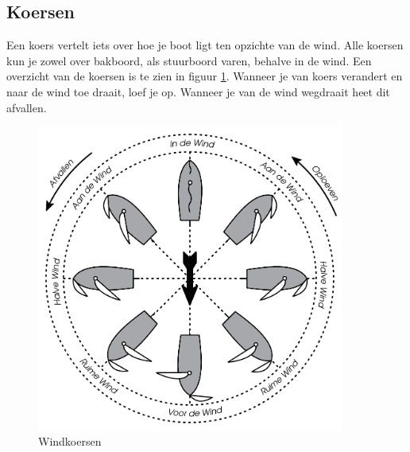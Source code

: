 \subsection{Koersen}
Een koers vertelt iets over hoe je boot ligt ten opzichte van de wind. Alle koersen kun je zowel over bakboord, als stuurboord varen, behalve in de wind. Een overzicht van de koersen is te zien in figuur \ref{pic:koersen}. Wanneer je van koers verandert en naar de wind toe draait, loef je op. Wanneer je van de wind wegdraait heet dit afvallen. 

\begin{figure}[h]
	\centering
	\includegraphics[width=0.9\textwidth]{Hoofdstukken/Onderdelen/pdf/koersen.pdf}
	\caption{Windkoersen}
	\label{pic:koersen}
\end{figure}



